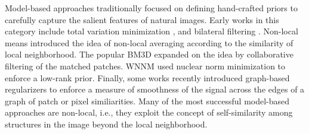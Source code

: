 \documentclass[journal]{IEEEtran}
\begin{document}
Model-based approaches traditionally focused on defining hand-crafted priors to carefully capture the salient features of natural images. Early works in this category include total variation minimization \cite{rudin1992nonlinear}, and bilateral filtering \cite{tomasi1998bilateral}. Non-local means \cite{buades2005non} introduced the idea of non-local averaging according to the similarity of local neighborhood. The popular BM3D \cite{dabov2007image} expanded on the idea by collaborative filtering of the matched patches. WNNM \cite{gu2014weighted} used nuclear norm minimization to enforce a low-rank prior. Finally, some works recently introduced graph-based regularizers \cite{pang2017graph} to enforce a measure of smoothness of the signal across the edges of a graph of patch or pixel similiarities.   
Many of the most successful model-based approaches are non-local, i.e., they exploit the concept of self-similarity among structures in the image beyond the local neighborhood.
\end{document}
